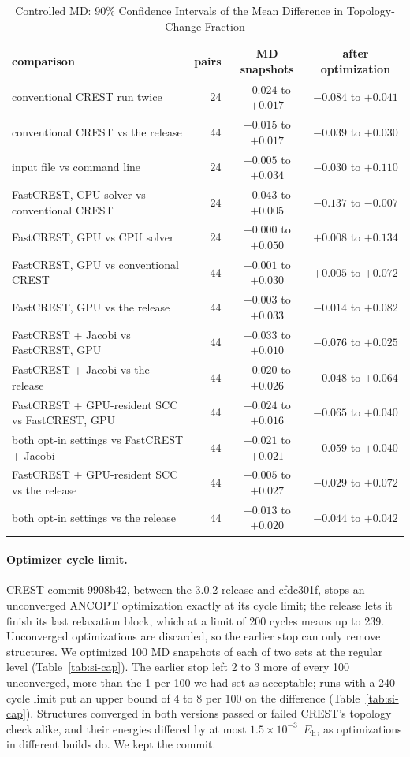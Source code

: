 \documentclass[journal=jctcce,manuscript=suppinfo]{achemso}
\newcommand{\Eh}{\ensuremath{E_\mathrm{h}}}
\begin{document}
\begin{table}[tbp]
\caption{Controlled MD: 90\% Confidence Intervals of the Mean Difference in Topology-Change Fraction}
\label{tab:si-md}
\small
\begin{tabular}{@{}L{0.52\textwidth}rcc@{}}
\toprule
comparison & pairs & MD snapshots & after optimization \\
\midrule
conventional CREST run twice & 24 & $-0.024$ to $+0.017$ & $-0.084$ to $+0.041$ \\
conventional CREST vs the release & 44 & $-0.015$ to $+0.017$ & $-0.039$ to $+0.030$ \\
input file vs command line & 24 & $-0.005$ to $+0.034$ & $-0.030$ to $+0.110$ \\
FastCREST, CPU solver vs conventional CREST & 24 & $-0.043$ to $+0.005$ & $-0.137$ to $-0.007$ \\
FastCREST, GPU vs CPU solver & 24 & $-0.000$ to $+0.050$ & $+0.008$ to $+0.134$ \\
FastCREST, GPU vs conventional CREST & 44 & $-0.001$ to $+0.030$ & $+0.005$ to $+0.072$ \\
FastCREST, GPU vs the release & 44 & $-0.003$ to $+0.033$ & $-0.014$ to $+0.082$ \\
FastCREST + Jacobi vs FastCREST, GPU & 44 & $-0.033$ to $+0.010$ & $-0.076$ to $+0.025$ \\
FastCREST + Jacobi vs the release & 44 & $-0.020$ to $+0.026$ & $-0.048$ to $+0.064$ \\
FastCREST + GPU-resident SCC vs FastCREST, GPU & 44 & $-0.024$ to $+0.016$ & $-0.065$ to $+0.040$ \\
both opt-in settings vs FastCREST + Jacobi & 44 & $-0.021$ to $+0.021$ & $-0.059$ to $+0.040$ \\
FastCREST + GPU-resident SCC vs the release & 44 & $-0.005$ to $+0.027$ & $-0.029$ to $+0.072$ \\
both opt-in settings vs the release & 44 & $-0.013$ to $+0.020$ & $-0.044$ to $+0.042$ \\
\bottomrule
\end{tabular}
\end{table}

\paragraph{Optimizer cycle limit.}
\label{si:cap}
CREST commit 9908b42, between the 3.0.2 release and cfdc301f, stops an unconverged ANCOPT optimization exactly at its
cycle limit; the release lets it finish its last relaxation block, which at a limit of 200 cycles means up to 239. Unconverged optimizations are discarded, so the earlier stop can only remove structures. We optimized 100 MD snapshots of each of two sets at the regular level
(Table~\ref{tab:si-cap}). The earlier stop left 2 to 3 more of every 100 unconverged, more than the 1 per 100 we had set as acceptable; runs with a 240-cycle limit put an upper bound of 4 to 8 per 100 on the difference (Table~\ref{tab:si-cap}). Structures converged in both versions passed
or failed CREST's topology check alike, and their energies differed by at most $1.5\times10^{-3}$~\Eh, as optimizations
in different builds do. We kept the commit.
\end{document}
